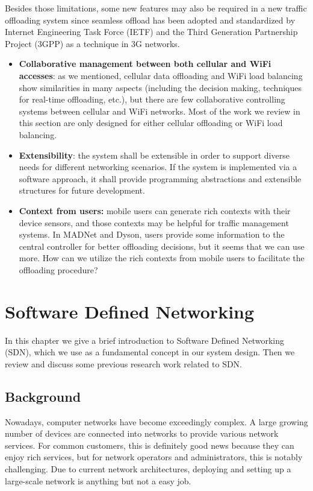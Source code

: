 \documentclass[english]{tktltiki}
\begin{document}
Besides those limitations, some new features may also be required in a new traffic offloading system since seamless offload has been adopted and standardized by Internet Engineering Task Force (IETF) and the Third Generation Partnership Project (3GPP) as a technique in 3G networks.

\begin{itemize}
  \item \textbf{Collaborative management between both cellular and WiFi accesses}: as we mentioned, cellular data offloading and WiFi load balancing show similarities in many aspects (including the decision making, techniques for real-time offloading, etc.), but there are few collaborative controlling systems between cellular and WiFi networks. Most of the work we review in this section are only designed for either cellular offloading or WiFi load balancing.
  \item \textbf{Extensibility}: the system shall be extensible in order to support diverse needs for different networking scenarios. If the system is implemented via a software approach, it shall provide programming abstractions and extensible structures for future development. 
  \item \textbf{Context from users:} mobile users can generate rich contexts with their device sensors, and those contexts may be helpful for traffic management systems. In MADNet and Dyson, users provide some information to the central controller for better offloading decisions, but it seems that we can use more. How can we utilize the rich contexts from mobile users to facilitate the offloading procedure?  
\end{itemize}


\newpage

\section{Software Defined Networking}

In this chapter we give a brief introduction to Software Defined Networking (SDN), which we use as a fundamental concept in our system design. Then we review and discuss some previous research work related to SDN.

\subsection{Background}

Nowadays, computer networks have become exceedingly complex. A large growing number of devices are connected into networks to provide various network services. For common customers, this is definitely good news because they can enjoy rich services, but for network operators and administrators, this is notably challenging. Due to current network architectures, deploying and setting up a large-scale network is anything but not a easy job.
\end{document}
